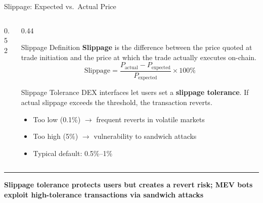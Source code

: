 \documentclass[8pt,aspectratio=169]{beamer}
\newcommand{\bottomnote}[1]{\vfill\vspace{-2mm}\textcolor{mllavender2}{\rule{\textwidth}{0.4pt}}\vspace{1mm}\footnotesize\textbf{#1}}
\begin{document}
\begin{frame}{Slippage: Expected vs.\ Actual Price}
\begin{columns}[T]
\begin{column}{0.52\textwidth}
    \end{column}
    \begin{column}{0.44\textwidth}
      \begin{block}{Slippage Definition}
        \textbf{Slippage} is the difference between the price quoted at trade initiation and the
        price at which the trade actually executes on-chain.
        \[
          \text{Slippage} = \frac{P_{\text{actual}} - P_{\text{expected}}}{P_{\text{expected}}} \times 100\%
        \]
      \end{block}
      \vspace{3mm}
      \begin{block}{Slippage Tolerance}
        DEX interfaces let users set a \textbf{slippage tolerance}. If actual slippage exceeds the
        threshold, the transaction reverts.
        \begin{itemize}\setlength\itemsep{2pt}
          \item Too low (0.1\%) $\to$ frequent reverts in volatile markets
          \item Too high (5\%) $\to$ vulnerability to sandwich attacks
          \item Typical default: 0.5\%--1\%
        \end{itemize}
      \end{block}
    \end{column}
  \end{columns}
  \bottomnote{Slippage tolerance protects users but creates a revert risk; MEV bots exploit high-tolerance transactions via sandwich attacks}
\end{frame}
\end{document}
